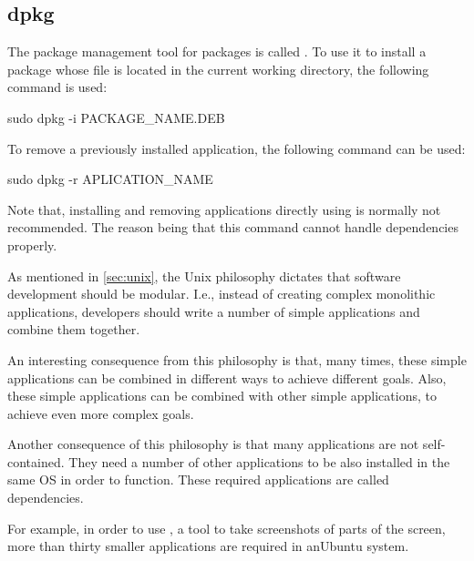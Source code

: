 \subsection{dpkg}

The package management tool for  packages is called . To use it to install a package whose  file is located in the current working directory, the following command is used:

\begin{command_line}[make]
sudo dpkg -i PACKAGE_NAME.DEB
\end{command_line}

To remove a previously installed application, the following command can be used:

\begin{command_line}[make]
sudo dpkg -r APLICATION_NAME
\end{command_line}

Note that, installing and removing applications directly using  is normally not recommended. The reason being that this command cannot handle dependencies properly.
\vspace{1cm}

\begin{my_box}[Dependencies]
\label{box:dependencies}

As mentioned in \ref{sec:unix}, the Unix philosophy dictates that software development should be modular. I.e., instead of creating complex monolithic applications, developers should write a number of simple applications and combine them together.

An interesting consequence from this philosophy is that, many times, these simple applications can be combined in different ways to achieve different goals. Also, these simple applications can be combined with other simple applications, to achieve even more complex goals.

Another consequence of this philosophy is that many applications are not self-contained. They need a number of other applications to be also installed in the same \acs{OS} in order to function. These required applications are called dependencies.

For example, in order to use , a tool to take screenshots of parts of the screen, more than thirty smaller applications are required in anUbuntu system.
\end{my_box}


